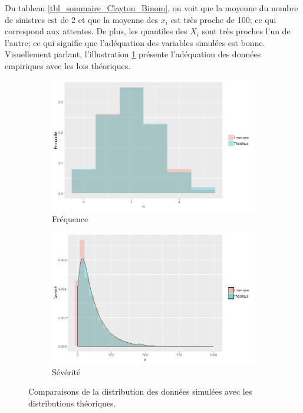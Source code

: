 \documentclass{article}
\begin{document}
	Du tableau \ref{tbl_sommaire_Clayton_Binom}, on voit que la moyenne du nombre de sinistres est de 2 et que la moyenne des $x_i$ est très proche de 100; ce qui correspond aux attentes.
	De plus, les quantiles des $X_i$ sont très proches l'un de l'autre; ce qui signifie que l'adéquation des variables simulées est bonne. \\
	
	Visuellement parlant, l'illustration \ref{graph_densite_Binom} présente l'adéquation des données empiriques avec les lois théoriques.

	\begin{figure}[H]
	\begin{subfigure}[l]{0.5\textwidth}
		\includegraphics[width=\textwidth]{Graph/Clayton_Binom_N.png}
		\caption{Fréquence}
	\end{subfigure}
	\begin{subfigure}[r]{0.5\textwidth}
		\includegraphics[width=\textwidth]{Graph/Clayton_Binom_X.png}
		\caption{Sévérité}
	\end{subfigure}
	\caption{Comparaisons de la distribution des données simulées avec les distributions théoriques.}
	\label{graph_densite_Binom}
	\end{figure}
	
\end{document}
